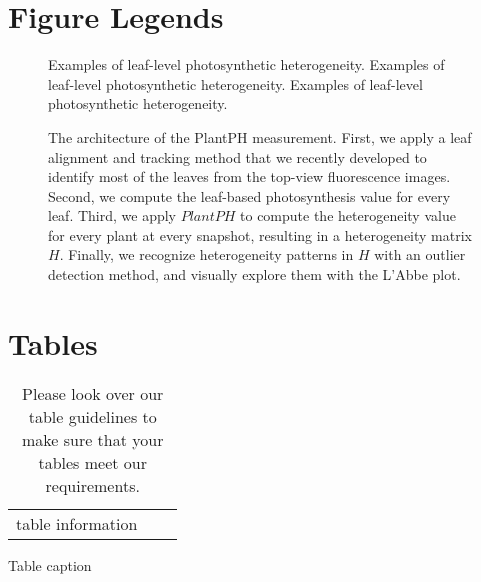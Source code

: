 {\section*{Figure Legends}
%

\begin{figure}[!h]
\caption{ Examples of leaf-level photosynthetic heterogeneity. Examples of leaf-level photosynthetic heterogeneity. Examples of leaf-level photosynthetic heterogeneity.}
\label{fig:heterogeneityexample}
\end{figure}

\begin{figure}[!h]
\caption{ The architecture of the PlantPH measurement. First, we apply a leaf alignment and tracking method that we recently developed to identify most of the leaves from the top-view fluorescence images. Second, we compute the leaf-based photosynthesis value for every leaf. Third, we apply $PlantPH$ to compute the heterogeneity value for every plant at every snapshot, resulting in a heterogeneity matrix $H$. Finally, we recognize heterogeneity patterns in $H$ with an outlier detection method, and visually explore them with the L'Abbe plot.}
\label{fig:architecture}
\end{figure}



\section*{Tables}
%
%
%
\begin{table}[!h]
\caption{Please look over our table guidelines  to make sure that your tables meet our requirements.}
\begin{tabular}{|c|c|c|}
table information
\end{tabular}
\begin{flushleft}Table caption
\end{flushleft}
\label{tab:label}
 \end{table}

}
